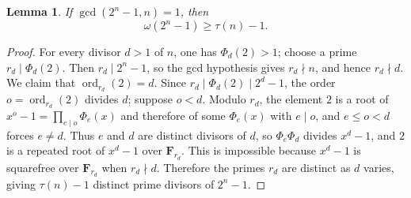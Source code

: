 \documentclass[11pt]{amsart}
\newtheorem{lemma}[theorem]{Lemma}
\theoremstyle{remark}
\DeclareMathOperator{\ord}{ord}
\begin{document}
\begin{lemma}\label{lem:cyclotomic}
If $\gcd(2^n-1,n)=1$, then
\[
\omega(2^n-1)\ge \tau(n)-1.
\]
\end{lemma}

\begin{proof}
For every divisor $d>1$ of $n$, one has $\Phi_d(2)>1$; choose a prime
$r_d\mid\Phi_d(2)$. Then $r_d\mid2^n-1$, so the gcd hypothesis gives
$r_d\nmid n$, and hence $r_d\nmid d$. We claim that
$\ord_{r_d}(2)=d$. Since $r_d\mid\Phi_d(2)\mid 2^d-1$, the order
$o=\ord_{r_d}(2)$ divides $d$; suppose $o<d$. Modulo $r_d$, the element
$2$ is a root of $x^o-1=\prod_{e\mid o}\Phi_e(x)$ and therefore of some
$\Phi_e(x)$ with $e\mid o$, and $e\le o<d$ forces $e\ne d$. Thus $e$
and $d$ are distinct divisors of $d$, so $\Phi_e\Phi_d$ divides
$x^d-1$, and $2$ is a repeated root of $x^d-1$ over
$\mathbf F_{r_d}$. This is impossible because $x^d-1$ is squarefree
over $\mathbf F_{r_d}$ when $r_d\nmid d$. Therefore the primes $r_d$
are distinct as $d$ varies, giving $\tau(n)-1$ distinct prime divisors
of $2^n-1$.
\end{proof}
\end{document}
